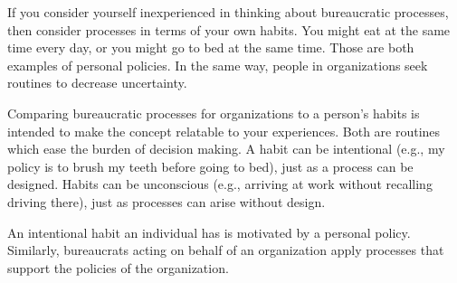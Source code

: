 
If you consider yourself inexperienced in thinking about bureaucratic processes, then consider processes in terms of your own habits. You might eat at the same time every day, or you might go to bed at the same time. Those are both examples of personal policies. In the same way, people in organizations seek routines to decrease uncertainty. 

Comparing bureaucratic processes for organizations to a person's habits is intended to make the concept relatable to your experiences. Both are routines which ease the burden of decision making. A habit can be intentional (e.g., my policy is to brush my teeth before going to bed), just as a process can be designed. Habits can be unconscious (e.g., arriving at work without recalling driving there), just as processes can arise without design. 

An intentional habit an individual has is motivated by a personal policy. Similarly, bureaucrats acting on behalf of an organization apply processes that support the policies of the organization.

